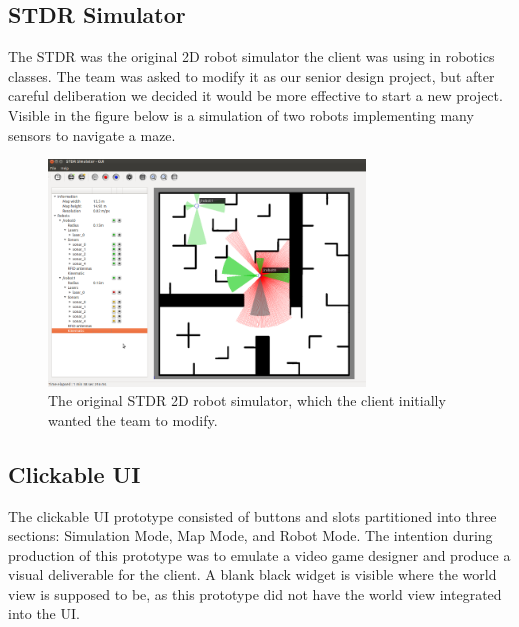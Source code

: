 \subsection{STDR Simulator}

The STDR was the original 2D robot simulator the client was using in robotics classes. The team was asked to modify it as our senior design project, but after careful deliberation we decided it would be more effective to start a new project. Visible in the figure below is a simulation of two robots implementing many sensors to navigate a maze.

\begin{figure}[!htb]
\begin{center}
\includegraphics[width=0.75\textwidth]{./Images/Sprint0_STDR}
\end{center}
\caption{The original STDR 2D robot simulator, which the client initially wanted the team to modify.  \label{stdr}}
\end{figure}

\subsection{Clickable UI}

The clickable UI prototype consisted of buttons and slots partitioned into three sections: Simulation Mode, Map Mode, and Robot Mode. The intention during production of this prototype was to emulate a video game designer and produce a visual deliverable for the client. A blank black widget is visible where the world view is supposed to be, as this prototype did not have the world view integrated into the UI.\newline\newline\newline
\newline\newline\newline
\newline\newline\newline

